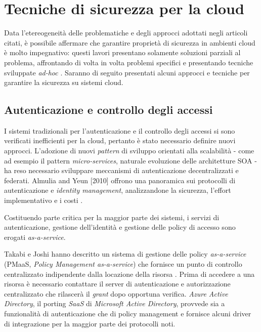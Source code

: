 \documentclass[../main.tex]{subfiles}
\begin{document}
\section{Tecniche di sicurezza per la cloud}
Data l'etereogeneità delle problematiche e degli approcci adottati negli articoli citati, è possibile affermare che garantire proprietà di sicurezza in ambienti cloud è molto impegnativo: questi lavori presentano solamente soluzioni parziali al problema, affrontando di volta in volta problemi specifici e presentando tecniche sviluppate \textit{ad-hoc} \cite{Ardagna:2015:SAC:2808687.2767005}.
Saranno di seguito presentati alcuni approcci e tecniche per garantire la sicurezza su sistemi cloud.

\subsection{Autenticazione e controllo degli accessi}
I sistemi tradizionali per l'autenticazione e il controllo degli accessi si sono verificati inefficienti per la cloud, pertanto è stato necessario definire nuovi approcci. L'adozione di nuovi \textit{pattern} di sviluppo orientati alla scalabilità - come ad esempio il pattern \textit{micro-services}, naturale evoluzione delle architetture SOA - ha reso necessario sviluppare meccanismi di autenticazione decentralizzati e federati.
Almulia and Yeun [2010] offrono una panoramica sui protocolli di autenticazione e \textit{identity management}, analizzandone la sicurezza, l'effort implementativo e i costi \cite{Ieee5542654}.

Costituendo parte critica per la maggior parte dei sistemi, i servizi di autenticazione, gestione dell'identità e gestione delle policy di accesso sono erogati \textit{as-a-service}.

Takabi e Joshi hanno descritto un sistema di gestione delle policy \textit{as-a-service} (PMaaS, \textit{Policy Management as-a-service}) che fornisce un punto di controllo centralizzato indipendente dalla locazione della risorsa \cite{pittir13526}.
Prima di accedere a una risorsa è necessario contattare il server di autenticazione e autorizzazione centralizzato che rilascerà il \textit{grant} dopo opportuna verifica.
\textit{Azure Active Directory}, il porting \textit{SaaS} di \textit{Microsoft Active Directory}, provvede sia a funzionalità di autenticazione che di policy management e fornisce alcuni driver di integrazione per la maggior parte dei protocolli noti.
\end{document}
